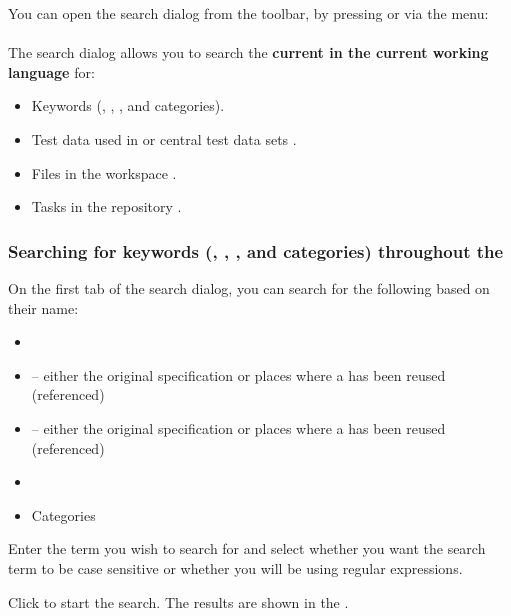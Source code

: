 You can open the search dialog from the toolbar, by pressing  or via the menu:\\
\\

The search dialog allows you to search the \textbf{current \gdproject{} in the  current working language} for:

\begin{itemize}
\item Keywords  (\gdcases{}, \gdsteps{}, \gdsuites{}, \gdjobs{} and categories).
\item Test data used in \gdcases{} or central test data sets .
\item Files in the workspace .
\item Tasks in the repository .
\end{itemize}


\subsubsection{Searching for keywords (\gdcases{}, \gdsteps{}, \gdsuites{}, \gdjobs{} and categories) throughout the \gdproject{}}
\label{TasksSearchKeywords}

On the first tab of the search dialog, you can search for the following based on their name:

\begin{itemize}
\item \gdsteps{}
\item \gdcases{} -- either the original specification or places where a \gdcase{} has been reused (referenced)
\item \gdsuites{} -- either the original specification or places where a \gdsuite{} has been reused (referenced)
\item \gdjobs{}
\item Categories
\end{itemize}

Enter the term you wish to search for and select whether you want the search term to be case sensitive or whether you will be using regular expressions. 

Click  to start the search. The results are shown in the \gdsearchresultview{} . 

